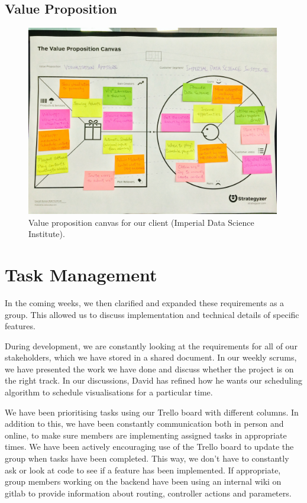 \documentclass[a4paper]{article}
\begin{document}
\subsection{Value Proposition}
\begin{figure}[H]
   \begin{center}
      \includegraphics[width = 0.99\textwidth, trim = 1cm 6.5cm 1cm 4.5cm, clip]{./evaluation/value_prop_canvas.jpg}
   \end{center}
   \caption{Value proposition canvas for our client (Imperial Data
            Science Institute).}
   \label{fig:valpropcanvas}
\end{figure}



\section{Task Management}
In the coming weeks, we then clarified and expanded these requirements as 
a group. This allowed us to discuss implementation and technical details
of specific features.


During development, we are constantly looking at the requirements for all of our stakeholders, which 
we have stored in a shared document. In our weekly scrums, we have 
presented the work we have done and discuss whether the project is on the 
right track. In our discussions, David has refined how he wants our
scheduling algorithm to schedule visualisations for a particular time. 



We have been prioritising tasks using our Trello board with different
columns. In addition to this, we have been constantly communication both 
in person and online, to make sure members are implementing assigned tasks
in appropriate times. We have been actively encouraging use of the Trello 
board to update the group when tasks have been completed. This way, 
we don't have to constantly ask or look at code to see if a feature has 
been implemented. If appropriate, group members working on the backend
have been using an internal wiki on gitlab to provide information about
routing, controller actions and parameters. 
\end{document}
